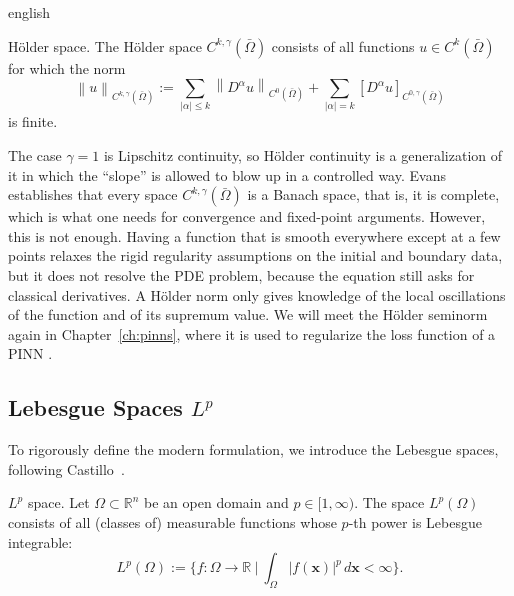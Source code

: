 \documentclass[11pt,letterpaper,twoside,openright]{book} %
\newcommand{\norm}[1]{\left\lVert #1 \right\rVert}
\newcommand{\abs}[1]{\left\lvert #1 \right\rvert}
\begin{document}
\begin{hyphenrules}{english}
\begin{definicion}{Hölder space.}\label{def:holder-space}
The Hölder space $C^{k,\gamma}(\bar\Omega)$ consists of all functions $u\in C^k(\bar\Omega)$ for which
the norm
\begin{equation}
  \norm{u}_{C^{k,\gamma}(\bar\Omega)}:=\sum_{\abs{\alpha}\le k}\norm{D^\alpha u}_{C^0(\bar\Omega)}
  +\sum_{\abs{\alpha}=k}[D^\alpha u]_{C^{0,\gamma}(\bar\Omega)}
  \label{eq:holder-norm}
\end{equation}
is finite.
\end{definicion}

The case $\gamma=1$ is Lipschitz continuity, so Hölder continuity is a generalization of it in which the
``slope'' is allowed to blow up in a controlled way. Evans~\cite{evans2010} establishes that every space
$C^{k,\gamma}(\bar\Omega)$ is a Banach space, that is, it is complete, which is what one needs for
convergence and fixed-point arguments. However, this is not enough. Having a function that is smooth
everywhere except at a few points relaxes the rigid regularity assumptions on the initial and boundary
data, but it does not resolve the PDE problem, because the equation still asks for classical
derivatives. A Hölder norm only gives knowledge of the local oscillations of the function and of its
supremum value. We will meet the Hölder seminorm again in Chapter~\ref{ch:pinns}, where it is used to
regularize the loss function of a PINN \cite{shin2020convergence}.

\subsection{Lebesgue Spaces $L^p$}\label{subsec:lp}

To rigorously define the modern formulation, we introduce the Lebesgue spaces, following
Castillo~\cite{castillo2014}.

\begin{definicion}{$L^p$ space.}\label{def:lp}
Let $\Omega\subset\mathbb{R}^n$ be an open domain and $p\in[1,\infty)$. The space $L^p(\Omega)$ consists of all
(classes of) measurable functions whose $p$-th power is Lebesgue integrable:
\begin{equation}
  L^p(\Omega):=\Big\{f:\Omega\to\mathbb{R}\ \Big|\ \int_\Omega\abs{f(\mathbf{x})}^p\,d\mathbf{x}<\infty\Big\}.
  \label{eq:lp}
\end{equation}
\end{definicion}


\end{hyphenrules}
\end{document}
